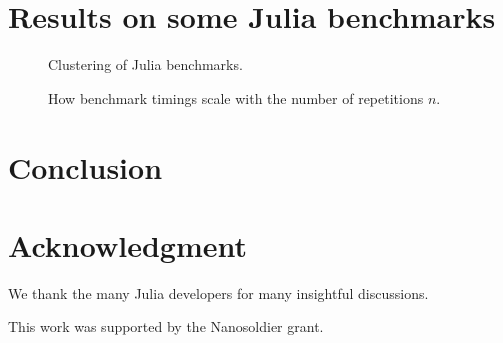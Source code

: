 \documentclass[conference]{IEEEtran}
\begin{document}
\section{Results on some Julia benchmarks}

\begin{figure}[!t]
\centering
{}
\caption{Clustering of Julia benchmarks.}
\label{fig:benchclusters}
\end{figure}

\begin{figure}[!t]
\centering
{}
\caption{How benchmark timings scale with the number of repetitions $n$.}
\label{fig:scaling}
\end{figure}

%

\section{Conclusion}


\section*{Acknowledgment}

We thank the many Julia developers for many insightful discussions.

This work was supported by the Nanosoldier grant.




\end{document}
